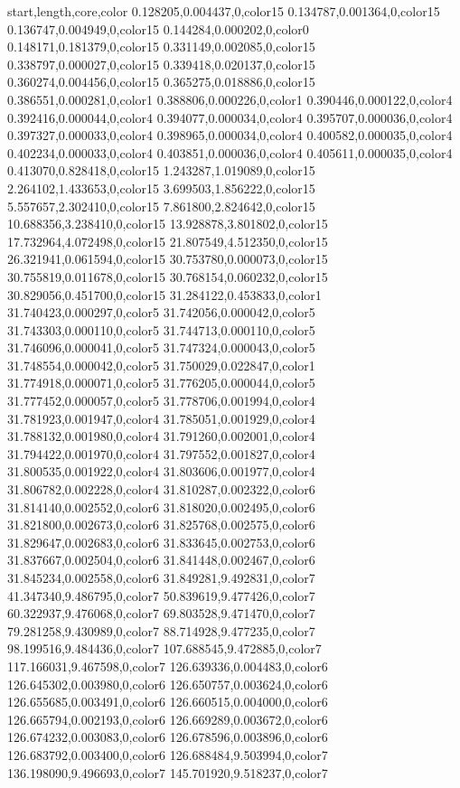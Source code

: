 start,length,core,color
0.128205,0.004437,0,color15
0.134787,0.001364,0,color15
0.136747,0.004949,0,color15
0.144284,0.000202,0,color0
0.148171,0.181379,0,color15
0.331149,0.002085,0,color15
0.338797,0.000027,0,color15
0.339418,0.020137,0,color15
0.360274,0.004456,0,color15
0.365275,0.018886,0,color15
0.386551,0.000281,0,color1
0.388806,0.000226,0,color1
0.390446,0.000122,0,color4
0.392416,0.000044,0,color4
0.394077,0.000034,0,color4
0.395707,0.000036,0,color4
0.397327,0.000033,0,color4
0.398965,0.000034,0,color4
0.400582,0.000035,0,color4
0.402234,0.000033,0,color4
0.403851,0.000036,0,color4
0.405611,0.000035,0,color4
0.413070,0.828418,0,color15
1.243287,1.019089,0,color15
2.264102,1.433653,0,color15
3.699503,1.856222,0,color15
5.557657,2.302410,0,color15
7.861800,2.824642,0,color15
10.688356,3.238410,0,color15
13.928878,3.801802,0,color15
17.732964,4.072498,0,color15
21.807549,4.512350,0,color15
26.321941,0.061594,0,color15
30.753780,0.000073,0,color15
30.755819,0.011678,0,color15
30.768154,0.060232,0,color15
30.829056,0.451700,0,color15
31.284122,0.453833,0,color1
31.740423,0.000297,0,color5
31.742056,0.000042,0,color5
31.743303,0.000110,0,color5
31.744713,0.000110,0,color5
31.746096,0.000041,0,color5
31.747324,0.000043,0,color5
31.748554,0.000042,0,color5
31.750029,0.022847,0,color1
31.774918,0.000071,0,color5
31.776205,0.000044,0,color5
31.777452,0.000057,0,color5
31.778706,0.001994,0,color4
31.781923,0.001947,0,color4
31.785051,0.001929,0,color4
31.788132,0.001980,0,color4
31.791260,0.002001,0,color4
31.794422,0.001970,0,color4
31.797552,0.001827,0,color4
31.800535,0.001922,0,color4
31.803606,0.001977,0,color4
31.806782,0.002228,0,color4
31.810287,0.002322,0,color6
31.814140,0.002552,0,color6
31.818020,0.002495,0,color6
31.821800,0.002673,0,color6
31.825768,0.002575,0,color6
31.829647,0.002683,0,color6
31.833645,0.002753,0,color6
31.837667,0.002504,0,color6
31.841448,0.002467,0,color6
31.845234,0.002558,0,color6
31.849281,9.492831,0,color7
41.347340,9.486795,0,color7
50.839619,9.477426,0,color7
60.322937,9.476068,0,color7
69.803528,9.471470,0,color7
79.281258,9.430989,0,color7
88.714928,9.477235,0,color7
98.199516,9.484436,0,color7
107.688545,9.472885,0,color7
117.166031,9.467598,0,color7
126.639336,0.004483,0,color6
126.645302,0.003980,0,color6
126.650757,0.003624,0,color6
126.655685,0.003491,0,color6
126.660515,0.004000,0,color6
126.665794,0.002193,0,color6
126.669289,0.003672,0,color6
126.674232,0.003083,0,color6
126.678596,0.003896,0,color6
126.683792,0.003400,0,color6
126.688484,9.503994,0,color7
136.198090,9.496693,0,color7
145.701920,9.518237,0,color7
